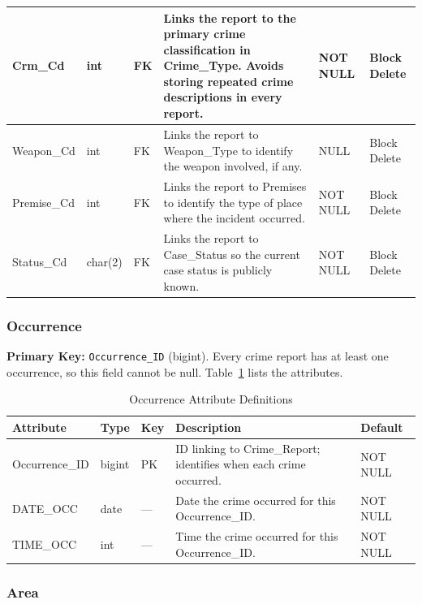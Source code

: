 \documentclass[conference]{IEEEtran}
\begin{document}
\begin{table}[htbp]
\begin{center}
\begin{tabular}{|p{2cm}|p{2cm}|p{0.7cm}|p{6.5cm}|p{1.8cm}|p{1.8cm}|}
\hline
Crm\_Cd & int & FK & Links the report to the primary crime classification in Crime\_Type. Avoids storing repeated crime descriptions in every report. & NOT NULL & Block Delete \\
\hline
Weapon\_Cd & int & FK & Links the report to Weapon\_Type to identify the weapon involved, if any. & NULL & Block Delete \\
\hline
Premise\_Cd & int & FK & Links the report to Premises to identify the type of place where the incident occurred. & NOT NULL & Block Delete \\
\hline
Status\_Cd & char(2) & FK & Links the report to Case\_Status so the current case status is publicly known. & NOT NULL & Block Delete \\
\hline
\end{tabular}
\end{center}
\end{table}

\subsubsection{Occurrence}

\textbf{Primary Key:} \texttt{Occurrence\_ID} (bigint). Every crime report has at least one occurrence, so this field cannot be null. Table~\ref{tab:occurrence} lists the attributes.

\begin{table}[htbp]
\caption{Occurrence Attribute Definitions}
\label{tab:occurrence}
\begin{center}
\footnotesize
\begin{tabular}{|p{1.6cm}|p{1cm}|p{0.5cm}|p{3.2cm}|p{1.2cm}|}
\hline
\textbf{Attribute} & \textbf{Type} & \textbf{Key} & \textbf{Description} & \textbf{Default} \\
\hline
Occurrence\_ID & bigint & PK & ID linking to Crime\_Report; identifies when each crime occurred. & NOT NULL \\
\hline
DATE\_OCC & date & --- & Date the crime occurred for this Occurrence\_ID. & NOT NULL \\
\hline
TIME\_OCC & int & --- & Time the crime occurred for this Occurrence\_ID. & NOT NULL \\
\hline
\end{tabular}
\end{center}
\end{table}

\subsubsection{Area}
\end{document}
